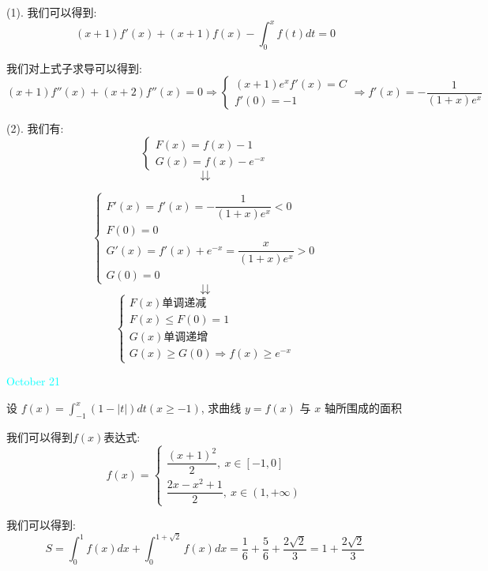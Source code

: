 \begin{solution}

	(1). 我们可以得到:  
	$$(x+1)f'(x)+(x+1)f(x)-\int_{0}^{x}f(t)dt=0$$
	
	我们对上式子求导可以得到:  
	$$(x+1)f''(x)+(x+2)f''(x)=0\Rightarrow \left\lbrace 
	\begin{array}{l}
		(x+1)e^{x}f'(x)=C\\
		f'(0)=-1
	\end{array}
	\right. \Rightarrow f'(x)=-\dfrac{1}{(1+x)e^{x}}$$
	
	(2). 我们有:  $$\left\lbrace 
	\begin{array}{l}
		F(x)=f(x)-1\\
		G(x)=f(x)-e^{-x}
	\end{array}
	\right.$$
	$$\downdownarrows$$ 
	
	$$\left\lbrace 
	\begin{array}{l}
		F'(x)=f'(x)=-\dfrac{1}{(1+x)e^{x}}<0\\
		F(0)=0\\
		G'(x)=f'(x)+e^{-x}=\dfrac{x}{(1+x)e^{x}}>0\\
		G(0)=0
	\end{array}
	\right.$$ 
	$$\downdownarrows$$ 
	$$\left\lbrace 
	\begin{array}{l}
		F(x)\text{单调递减}\\
		F(x)\leq F(0)=1\\
		G(x)\text{单调递增}\\
		G(x)\geq G(0)\Rightarrow f(x)\geq e^{-x}
	\end{array}
	\right. $$
\end{solution}


\textcolor{cyan}{October 21}

\begin{example}[][Exam: 36.3.13]
	设 $f(x)=\int_{-1}^{x}(1-|t|)dt(x\geq -1)$, 求曲线 $y=f(x)$ 与 $x$ 轴所围成的面积
\end{example}

\begin{solution}

	我们可以得到$f(x)$表达式:  
	$$f(x)=\left\lbrace 
	\begin{array}{l}
		\dfrac{(x+1)^2}{2},\ x\in[-1,0]\\
		\dfrac{2x-x^2+1}{2},\ x\in(1,+\infty)
	\end{array}
	\right. $$
	
	我们可以得到:  
	$$S=\int_{0}^{1}f(x)dx+\int_{0}^{1+\sqrt{2}}f(x)dx=\dfrac{1}{6}+\dfrac{5}{6}+\dfrac{2\sqrt{2}}{3}=1+\dfrac{2\sqrt{2}}{3}$$
\end{solution}

